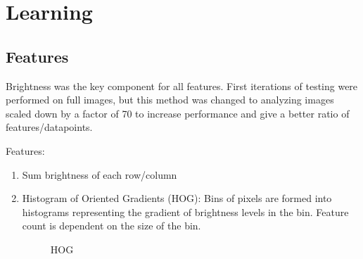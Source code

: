 \documentclass{article}
\begin{document}
\section{Learning}

\subsection{Features}
Brightness was the key component for all features. First iterations of testing were performed on full images, but this method was changed to analyzing images scaled down by a factor of 70 to increase performance and give a better ratio of features/datapoints. 

Features: 
\begin{enumerate}[1]
\item Sum brightness of each row/column
\item Histogram of Oriented Gradients (HOG): Bins of pixels are formed into histograms representing the gradient of brightness levels in the bin. Feature count is dependent on the size of the bin. 
\begin{figure}[H]
\centering
\setlength\fboxsep{2pt}
\setlength\fboxrule{0pt}
\caption{
HOG
}
\end{figure}



\end{enumerate}
\end{document}
